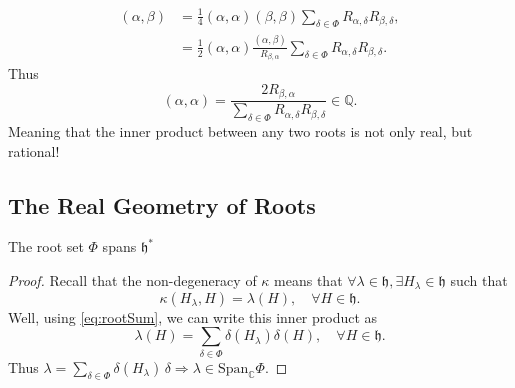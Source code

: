 \documentclass[11pt,fleqn]{article}
\renewenvironment{prop}{\begin{pBox}\begin{propT}}{\end{propT}\end{pBox}}
\begin{document}
\begin{remark}
		\begin{equation}
		\begin{split}
			(\alpha,\beta) 
			&= \tfrac{1}{4} (\alpha,\alpha)(\beta,\beta)
			\sum_{\delta \in \Phi} R_{\alpha,\delta}R_{\beta, \delta},\\
			&= \tfrac{1}{2} (\alpha,\alpha) \frac{(\alpha,\beta)}{R_{\beta,\alpha}} \sum_{\delta \in \Phi} R_{\alpha,\delta}R_{\beta, \delta}.
		\end{split}
		\end{equation}
	Thus
		\begin{equation}
			(\alpha,\alpha) =  \frac{2 R_{\beta,\alpha}}{\sum_{\delta \in \Phi} R_{\alpha,\delta} R_{\beta, \delta}} \in \mathbb{Q}.
		\end{equation}
	Meaning that the inner product between any two roots is not only real, but rational!
\end{remark}

\subsection{The Real Geometry of Roots}

\begin{prop}
	The root set $\Phi$ spans $\mathfrak{h}^*$
\end{prop}
\begin{proof}
	Recall that the non-degeneracy of $\kappa$ means that $\forall \lambda \in \mathfrak{h}, \exists H_\lambda \in \mathfrak{h}$ such that
		\begin{equation}
			\kappa(H_\lambda,H) = \lambda(H), \quad \forall H \in \mathfrak{h}.
		\end{equation}
	Well, using \eqref{eq:rootSum}, we can write this inner product as
		\begin{equation}
			\lambda(H) = \sum_{\delta \in \Phi} \delta(H_\lambda) \delta(H), \quad \forall H \in \mathfrak{h}.
		\end{equation}
	Thus $\lambda = \sum_{\delta \in \Phi} \delta(H_\lambda) \, \delta \Rightarrow \lambda \in \text{Span}_\mathbb{C} \Phi$.
\end{proof}
\end{document}
